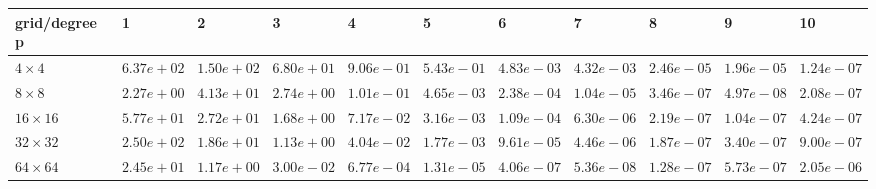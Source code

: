 \begin{tabular}{lllllllllll}
\hline
 grid/degree p   & 1          & 2          & 3          & 4          & 5          & 6          & 7          & 8          & 9          & 10         \\
\hline
 $4 \times 4$    & $6.37e+02$ & $1.50e+02$ & $6.80e+01$ & $9.06e-01$ & $5.43e-01$ & $4.83e-03$ & $4.32e-03$ & $2.46e-05$ & $1.96e-05$ & $1.24e-07$ \\
 $8 \times 8$    & $2.27e+00$ & $4.13e+01$ & $2.74e+00$ & $1.01e-01$ & $4.65e-03$ & $2.38e-04$ & $1.04e-05$ & $3.46e-07$ & $4.97e-08$ & $2.08e-07$ \\
 $16 \times 16$  & $5.77e+01$ & $2.72e+01$ & $1.68e+00$ & $7.17e-02$ & $3.16e-03$ & $1.09e-04$ & $6.30e-06$ & $2.19e-07$ & $1.04e-07$ & $4.24e-07$ \\
 $32 \times 32$  & $2.50e+02$ & $1.86e+01$ & $1.13e+00$ & $4.04e-02$ & $1.77e-03$ & $9.61e-05$ & $4.46e-06$ & $1.87e-07$ & $3.40e-07$ & $9.00e-07$ \\
 $64 \times 64$  & $2.45e+01$ & $1.17e+00$ & $3.00e-02$ & $6.77e-04$ & $1.31e-05$ & $4.06e-07$ & $5.36e-08$ & $1.28e-07$ & $5.73e-07$ & $2.05e-06$ \\
\hline
\end{tabular}